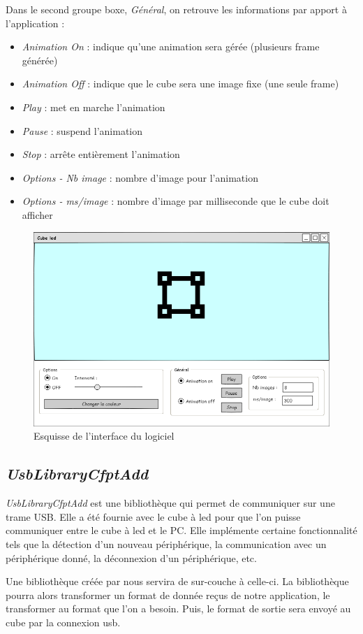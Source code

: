 \documentclass[a4paper,12pt]{article}
\begin{document}
\noindent Dans le second groupe boxe, \emph{Général}, on retrouve les informations par apport à l'application :
\begin{itemize}
	\item \emph{Animation On} : indique qu'une animation sera gérée (plusieurs frame générée)
	\item \emph{Animation Off} : indique que le cube sera une image fixe (une seule frame)
	\item \emph{Play} : met en marche l'animation
	\item \emph{Pause} : suspend l'animation
	\item \emph{Stop} : arrête entièrement l'animation
	\item \emph{Options - Nb image} : nombre d'image pour l'animation
	\item \emph{Options - ms/image} : nombre d'image par milliseconde que le cube doit afficher
\end{itemize}
\begin{figure}[htp]
	\centering
	\includegraphics[width=.60\textwidth]{img/windform.png}
	\caption{Esquisse de l'interface du logiciel}
	\label{interface}
\end{figure}

\subsection{\emph{UsbLibraryCfptAdd}}
\emph{UsbLibraryCfptAdd} est une bibliothèque qui permet de communiquer sur une trame USB. Elle a été fournie avec le cube à led pour que l'on puisse communiquer entre le cube à led et le PC. Elle implémente certaine fonctionnalité tels que la détection d'un nouveau périphérique, la communication avec un périphérique donné, la déconnexion d'un périphérique, etc. 

Une bibliothèque créée par nous servira de sur-couche à celle-ci. La bibliothèque pourra alors transformer un format de donnée reçus de notre application, le transformer au format que l'on a besoin. Puis, le format de sortie sera envoyé au cube par la connexion usb.
\newpage
\end{document}
